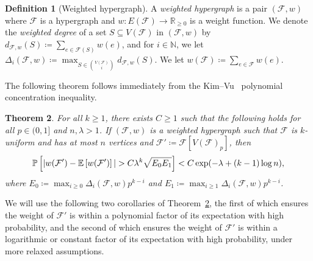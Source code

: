 \documentclass[11pt]{article}
\def\COMMENT#1{}
\numberwithin{equation}{section}
\newcounter{i}
\theoremstyle{plain}
\newtheorem{thm}{Theorem}[section]
\theoremstyle{plain} %
\theoremstyle{definition}
\newtheorem{definition}[thm]{Definition}
\newcommand{\cF}{\mathcal{F}}
\newcommand{\Prob}[1]{\ensuremath{%
\mathbb P\left[#1\right]
}}
\newcommand{\Expect}[1]{\ensuremath{%
\mathbb E\left[#1\right]
}}
\begin{document}
\begin{definition}[Weighted hypergraph]
A \textit{weighted hypergraph} is a pair $(\cF, w)$ where $\cF$ is a hypergraph and $w : E(\cF) \rightarrow \mathbb R_{\geq0}$ is a weight function.  We denote the \textit{weighted degree} of a set $S \subseteq V(\cF)$ in $(\cF, w)$ by $d_{\cF,w}(S) \coloneqq \sum_{e \in \cF(S)}w(e)$, and for $i \in \mathbb N$, we let $\Delta_i(\cF, w) \coloneqq \max_{S \in \binom{V(\cF)}{i}}d_{\cF,w}(S)$.  We let $w(\cF) \coloneqq \sum_{e \in \cF}w(e)$.
\end{definition}

The following theorem follows immediately from the Kim--Vu~\cite{KV00} polynomial concentration inequality.

\begin{thm}\label{thm:KimVu}
    For all $k \geq 1$, there exists $C \geq 1$ such that the following holds for all $p \in (0, 1]$ and $n, \lambda > 1$.  
    If $(\cF, w)$ is a weighted hypergraph such that $\cF$ is $k$-uniform and has at most $n$ vertices and $\cF' \coloneqq \cF[V(\cF)_p]$, then
    \begin{equation*}
        \Prob{|w(\cF') - \Expect{w(\cF')}| > C\lambda^k\sqrt{E_0E_1}} < C\exp(-\lambda + (k - 1)\log n),
    \end{equation*}
    where $E_0 \coloneqq \max_{i\geq 0}\Delta_i(\cF, w) p^{k - i}$ and $E_1 \coloneqq \max_{i\geq 1}\Delta_i(\cF, w) p^{k-i}$.
\end{thm}\COMMENT{%
    We apply Kim--Vu~\cite[Main Theorem]{KV00} to the hypergraph $\cF$, where $t_v$ for each $v\in V(\cF)$ is a $\{0,1\}$ random variable with expected value $p$, and $w(\cF')$ plays the role of $Y_\cF$. For each $A \subseteq \cF$, the (weighted) link hypergraph $\cF(A)$ plays the role of the ``truncated hypergraph'' $\cF_A$, so we have $\Expect{Y_{\cF_A}} = p^{k-i}d_{\cF,w}(A) \leq p^{k-i}\Delta_i(\cF,w)$ for $A$ of size $i$.  Hence, $E'(\cF) = E_1 \coloneqq \max_{i\geq1}\Delta_i(\cF, w)p^{k-i}$ and $E(\cF) = \max_{i\geq0}\Delta_i(\cF, w)p^{k-i}$.
}  
We will use the following two corollaries of Theorem~\ref{thm:KimVu}, the first of which ensures the weight of $\cF'$ is within a polynomial factor of its expectation with high probability, and the second of which ensures the weight of $\cF'$ is within a logarithmic or constant factor of its expectation with high probability, under more relaxed assumptions.
\end{document}

